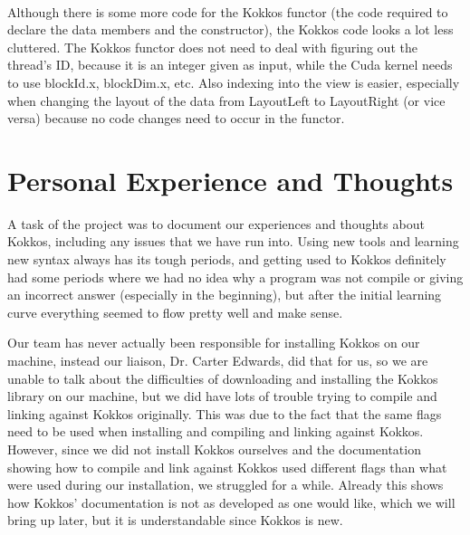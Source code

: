 \\
Although there is some more code for the Kokkos functor (the code required to declare the data members and the constructor), the Kokkos code looks a lot less cluttered. The Kokkos functor does not need to deal with figuring out the thread's ID, because it is an integer given as input, while the Cuda kernel needs to use blockId.x, blockDim.x, etc. Also indexing into the view is easier, especially when changing the layout of the data from LayoutLeft to LayoutRight (or vice versa) because no code changes need to occur in the functor.


\section{Personal Experience and Thoughts}
% 
A task of the project was to document our experiences and thoughts about Kokkos, including any issues that we have run into. Using new tools and learning new syntax always has its tough periods, and getting used to Kokkos definitely had some periods where we had no idea why a program was not compile or giving an incorrect answer (especially in the beginning), but after the initial learning curve everything seemed to flow pretty well and make sense. 

Our team has never actually been responsible for installing Kokkos on our machine, instead our liaison, Dr. Carter Edwards, did that for us, so we are unable to talk about the difficulties of downloading and installing the Kokkos library on our machine, but we did have lots of trouble trying to compile and linking against Kokkos originally. This was due to the fact that the same flags need to be used when installing and compiling and linking against Kokkos. However, since we did not install Kokkos ourselves and the documentation showing how to compile and link against Kokkos used different flags than what were used during our installation, we struggled for a while. Already this shows how Kokkos' documentation is not as developed as one would like, which we will bring up later, but it is understandable since Kokkos is new. 

